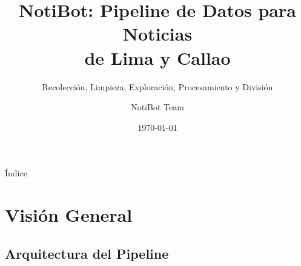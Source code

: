 \documentclass[11pt,aspectratio=169,spanish]{beamer}
\title[NotiBot — Pipeline de Datos]{
    NotiBot: Pipeline de Datos para Noticias\\
    de Lima y Callao
}
\subtitle{Recolección, Limpieza, Exploración, Procesamiento y División}
\author[]{NotiBot Team}
\date{\today}
\institute[]{Plataforma Inteligente de Noticias}
\begin{document}
\begin{frame}[plain]
    \maketitle
\end{frame}

\begin{frame}{Índice}
    \tableofcontents[hideallsubsections]
\end{frame}

\section{Visión General}
\subsection{Arquitectura del Pipeline}
\end{document}
